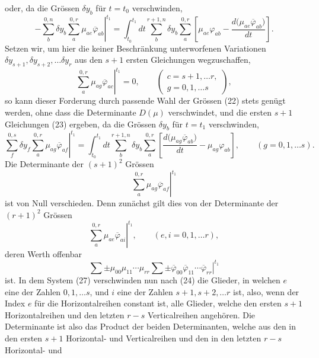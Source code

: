 \documentclass[11pt,a4paper,leqno]{article}
\begin{document}
oder, da die Grössen $\delta y_b$ für $t=t_0$ verschwinden,
\begin{equation}\tag{23}
-\left.
\sum_b^{0,n}\delta y_b\sum_a^{0,r}\mu_{ae}\overline{\varphi}_{ab}
\right|^{t_1}
=
\int_{t_0}^{t_1}dt\sum_b^{r+1,n}\delta y_b\sum_a^{0,r}
\left[
\mu_{ae}\varphi_{ab}-\frac{d\bigl(\mu_{ae}\overline{\varphi}_{ab}\bigr)}{dt}
\right].
\end{equation}
Setzen wir, um hier die keiner Beschränkung unterworfenen Variationen $\delta y_{s+1},\delta y_{s+2},\ldots\delta y_r$ aus den $s+1$ ersten Gleichungen wegzuschaffen,
\begin{equation}\tag{24}
\left.\sum_a^{0,r}\mu_{ag}\overline{\varphi}_{ac}\right|^{t_1}=0,
\qquad
\left(
\begin{gathered}
c=s+1,\ldots r,\\
g=0,1,\ldots s
\end{gathered}
\right),
\end{equation}
so kann dieser Forderung durch passende Wahl der Grössen (22) stets genügt werden, ohne dass die Determinante $D(\mu)$ verschwindet, und die ersten $s+1$ Gleichungen (23) ergeben, da die Grössen $\delta y_b$ für $t=t_1$ verschwinden,
\begin{equation}\tag{25}
\left.
\sum_f^{0,s}\delta y_f\sum_a^{0,r}\mu_{ag}\overline{\varphi}_{af}
\right|^{t_1}
=
\int_{t_0}^{t_1}dt\sum_b^{r+1,n}\delta y_b\sum_a^{0,r}
\left[
\frac{d\bigl(\mu_{ag}\overline{\varphi}_{ab}\bigr)}{dt}
-\mu_{ag}\varphi_{ab}
\right],
\qquad(g=0,1,\ldots s).
\end{equation}
Die Determinante der $(s+1)^2$ Grössen
\begin{equation}\tag{26}
\left.\sum_a^{0,r}\mu_{ag}\overline{\varphi}_{af}\right|^{t_1}
\end{equation}
ist von Null verschieden. Denn zunächst gilt dies von der Determinante der $(r+1)^2$ Grössen
\begin{equation}\tag{27}
\left.\sum_a^{0,r}\mu_{ae}\overline{\varphi}_{ai}\right|^{t_1},
\qquad(e,i=0,1,\ldots r),
\end{equation}
deren Werth offenbar
\[
\left.
\sum\mathord{\pm}\mu_{00}\mu_{11}\cdots\mu_{rr}
\sum\mathord{\pm}\overline{\varphi}_{00}\overline{\varphi}_{11}\cdots
\overline{\varphi}_{rr}
\right|^{t_1}
\]
ist. In dem System (27) verschwinden nun nach (24) die Glieder, in welchen $e$ eine der Zahlen $0,1,\ldots s$, und $i$ eine der Zahlen $s+1,s+2,\ldots r$ ist, also, wenn der Index $e$ für die Horizontalreihen constant ist, alle Glieder, welche den ersten $s+1$ Horizontalreihen und den letzten $r-s$ Verticalreihen angehören. Die Determinante ist also das Product der beiden Determinanten, welche aus den in den ersten $s+1$ Horizontal- und Verticalreihen und den in den letzten $r-s$ Horizontal- und
\end{document}
